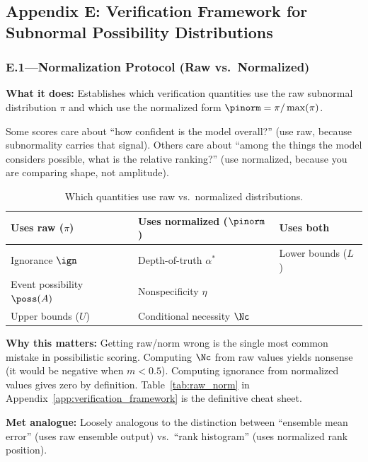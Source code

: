 \subsection{Appendix E: Verification Framework for Subnormal Possibility Distributions}\label{sec:plain_e}

\subsubsection{E.1---Normalization Protocol (Raw vs.\ Normalized)}\label{sec:plain_e1}

\textbf{What it does:} Establishes which verification quantities use the raw subnormal distribution $\pi$ and which use the normalized form $\pinorm = \pi / \max(\pi)$.

Some scores care about ``how confident is the model overall?'' (use raw, because subnormality carries that signal). Others care about ``among the things the model considers possible, what is the relative ranking?'' (use normalized, because you are comparing shape, not amplitude).

\begin{table}[htbp]
\centering
\small
\caption{Which quantities use raw vs.\ normalized distributions.}
\label{tab:raw_norm_plain}
\begin{tabular}{lll}
\toprule
Uses raw ($\pi$) & Uses normalized ($\pinorm$) & Uses both \\
\midrule
Ignorance $\ign$ & Depth-of-truth $\alpha^*$ & Lower bounds ($L$) \\
Event possibility $\poss(A)$ & Nonspecificity $\eta$ & \\
Upper bounds ($U$) & Conditional necessity $\Nc$ & \\
\bottomrule
\end{tabular}
\end{table}

\textbf{Why this matters:} Getting raw/norm wrong is the single most common mistake in possibilistic scoring. Computing $\Nc$ from raw values yields nonsense (it would be negative when $m < 0.5$). Computing ignorance from normalized values gives zero by definition. Table~\ref{tab:raw_norm} in Appendix~\ref{app:verification_framework} is the definitive cheat sheet.

\textbf{Met analogue:} Loosely analogous to the distinction between ``ensemble mean error'' (uses raw ensemble output) vs.\ ``rank histogram'' (uses normalized rank position).

